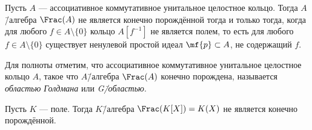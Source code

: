 \documentclass[
	extrafontsizes,
	11pt,
	hyphens,
]{memoir}
\begin{document}
%
%
%
%

\begin{observation}
Пусть \(A\) --- ассоциативное коммутативное унитальное целостное кольцо.%
\label{obs:JacDomFrac}
Тогда \(A\)\=/алгебра \(\Frac(A)\) не является конечно порождённой тогда и только тогда, когда для любого \(f \in A \setminus \{0\}\) кольцо \(A[f^{-1}]\) не является полем, то есть для любого \(f \in A \setminus \{0\}\) существует ненулевой простой идеал \(\mf{p} \subset A\), не содержащий \(f\).
\end{observation}

\begin{remark}
Для полноты отметим, что ассоциативное коммутативное унитальное целостное кольцо \(A\), такое что \(A\)\=/алгебра \(\Frac(A)\) конечно порождена, называется \emph{областью Голдмана} или \emph{G\=/областью}.
\end{remark}

\begin{theorem}
Пусть \(K\) --- поле.%
\label{thm:FieldPolyFracInfGen}
Тогда \(K\)\=/алгебра \(\Frac(K[X]) = K(X)\) не является конечно порождённой.
\end{theorem}
\end{document}
